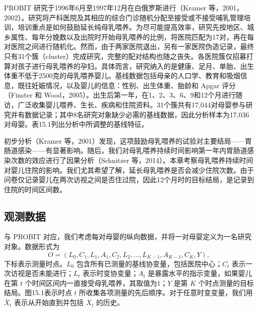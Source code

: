 PROBIT 研究于1996年6月至1997年12月在白俄罗斯进行（Kramer 等，2001，2002）。研究将产科医院及其相应的综合门诊随机分配至接受或不接受哺乳管理培训，培训重点是如何鼓励延长纯母乳喂养。为尽可能提高效率，研究先按地区、城乡属性、每年分娩数以及出院时开始母乳喂养的比例，将医院匹配为17对，再在每对医院之间进行随机化。然而，由于两家医院退出，另有一家医院伪造记录，最终只有31个簇（cluster）完成研究，完整的配对结构也随之丧失。各医院簇仅招募打算对孩子进行母乳喂养的孕妇。具体而言，研究纳入的是健康、足月、单胎、出生体重不低于2500克的母乳喂养婴儿。基线数据包括母亲的人口学、教育和吸烟信息，既往妊娠情况，以及婴儿的信息：性别、出生体重、胎龄和 Apgar 评分（Finster 和 Wood，2005）。出生后第一年，在1、2、3、6、9和12个月进行随访，广泛收集婴儿喂养、生长、疾病和住院资料。31个簇共有17,044对母婴参与研究并有数据记录；其中8名研究对象缺少必需的基线数据，因此分析样本为17,036对母婴。表15.1列出分析中所调整的基线特征。

初步分析（Kramer 等，2001）发现，这项鼓励母乳喂养的试验对主要结局——胃肠道感染——有显著影响。随后，我们对母乳喂养持续时间影响第一年内胃肠道感染次数的效应进行了因果分析（Schnitzer 等，2014）。本章考察母乳喂养持续时间对婴儿住院的影响。我们尤其希望了解，延长母乳喂养是否会减少住院次数。由于问卷仅记录婴儿在两次访视之间是否住过院，因此12个月时的目标结局，是记录到住院的时间区间数。

\subsection{观测数据}

与 PROBIT 对应，我们考虑每对母婴的纵向数据，并将一对母婴定义为一名研究对象。数据形式为
\[
 O=(L_0,C_1,L_1,A_1,C_2,L_2,\ldots,L_{K-1},A_{K-1},C_K,Y),
\]
下标表示测量时点。$L_0$ 包含所有已测量的基线协变量，包括医院中心；$C_t$ 表示一次访视是否未能进行；$L_t$ 表示时变协变量；$A_t$ 是暴露水平的指示变量，如果婴儿在第 $t$ 个时间区间内一直接受母乳喂养，其取值为1；$Y$ 是第 $K$ 个时点测量的目标结局。图15.1表示时点 $t$ 所收集各项测量的先后顺序。对于任意时变变量，我们用 $\bar X_t$ 表示从开始直到并包括 $X_t$ 的历史。

